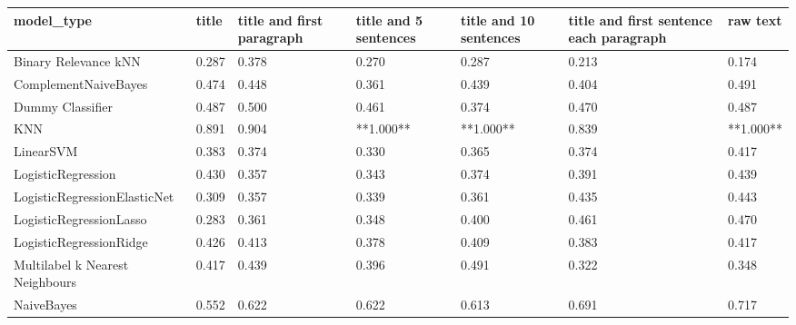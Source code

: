 \begin{tabular}{lllllll}
\toprule
                     model\_type & title & title and first paragraph & title and 5 sentences & title and 10 sentences & title and first sentence each paragraph &  raw text \\
\midrule
           Binary Relevance kNN & 0.287 &                     0.378 &                 0.270 &                  0.287 &                                   0.213 &     0.174 \\
           ComplementNaiveBayes & 0.474 &                     0.448 &                 0.361 &                  0.439 &                                   0.404 &     0.491 \\
               Dummy Classifier & 0.487 &                     0.500 &                 0.461 &                  0.374 &                                   0.470 &     0.487 \\
                            KNN & 0.891 &                     0.904 &             **1.000** &              **1.000** &                                   0.839 & **1.000** \\
                      LinearSVM & 0.383 &                     0.374 &                 0.330 &                  0.365 &                                   0.374 &     0.417 \\
             LogisticRegression & 0.430 &                     0.357 &                 0.343 &                  0.374 &                                   0.391 &     0.439 \\
   LogisticRegressionElasticNet & 0.309 &                     0.357 &                 0.339 &                  0.361 &                                   0.435 &     0.443 \\
        LogisticRegressionLasso & 0.283 &                     0.361 &                 0.348 &                  0.400 &                                   0.461 &     0.470 \\
        LogisticRegressionRidge & 0.426 &                     0.413 &                 0.378 &                  0.409 &                                   0.383 &     0.417 \\
Multilabel k Nearest Neighbours & 0.417 &                     0.439 &                 0.396 &                  0.491 &                                   0.322 &     0.348 \\
                     NaiveBayes & 0.552 &                     0.622 &                 0.622 &                  0.613 &                                   0.691 &     0.717 \\

\end{tabular}
